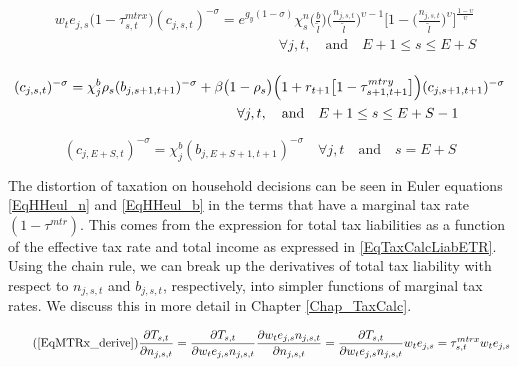   \begin{equation}\label{EqHHeul_n}
    \begin{split}
      &w_t e_{j,s}\bigl(1 - \tau^{mtrx}_{s,t}\bigr)(c_{j,s,t})^{-\sigma} = e^{g_y(1-\sigma)}\chi^n_{s}\biggl(\frac{b}{\tilde{l}}\biggr)\biggl(\frac{n_{j,s,t}}{\tilde{l}}\biggr)^{\upsilon-1}\Biggl[1 - \biggl(\frac{n_{j,s,t}}{\tilde{l}}\biggr)^\upsilon\Biggr]^{\frac{1-\upsilon}{\upsilon}} \\
      &\qquad\qquad\qquad\qquad\qquad\qquad\qquad\qquad\forall j,t, \quad\text{and}\quad E+1\leq s\leq E+S \\
    \end{split}
  \end{equation}

  \begin{equation}\label{EqHHeul_b}
    \begin{split}
      &(c_{j,s,t})^{-\sigma} = \chi^b_j\rho_s(b_{j,s+1,t+1})^{-\sigma} + \beta\bigl(1 - \rho_s\bigr)\Bigl(1 + r_{t+1}\bigl[1 - \tau^{mtry}_{s+1,t+1}\bigr]\Bigr)(c_{j,s+1,t+1})^{-\sigma} \\
      &\qquad\qquad\qquad\qquad\qquad\qquad\qquad\qquad\forall j,t, \quad\text{and}\quad E+1\leq s\leq E+S-1 \\
    \end{split}
  \end{equation}

  \begin{equation}\label{EqHHeul_bS}
    (c_{j,E+S,t})^{-\sigma} = \chi^b_j(b_{j,E+S+1,t+1})^{-\sigma} \quad\forall j,t \quad\text{and}\quad s = E+S
  \end{equation}



  The distortion of taxation on household decisions can be seen in Euler equations \eqref{EqHHeul_n} and \eqref{EqHHeul_b} in the terms that have a marginal tax rate $(1-\tau^{mtr})$. This comes from the expression for total tax liabilities as a function of the effective tax rate and total income as expressed in \eqref{EqTaxCalcLiabETR}. Using the chain rule, we can break up the derivatives of total tax liability with respect to $n_{j,s,t}$ and $b_{j,s,t}$, respectively, into simpler functions of marginal tax rates. We discuss this in more detail in Chapter \ref{Chap_TaxCalc}.

  \begin{equation}\tag{\ref{EqMTRx_derive}}
    \frac{\partial T_{s,t}}{\partial n_{j,s,t}}  = \frac{\partial T_{s,t}}{\partial w_t e_{j,s}n_{j,s,t}}\frac{\partial w_{t}e_{j,s}n_{j,s,t}}{\partial n_{j,s,t}} = \frac{\partial T_{s,t}}{\partial w_{t}e_{j,s}n_{j,s,t}}w_t e_{j,s} = \tau^{mtrx}_{s,t}w_t e_{j,s}
  \end{equation}

